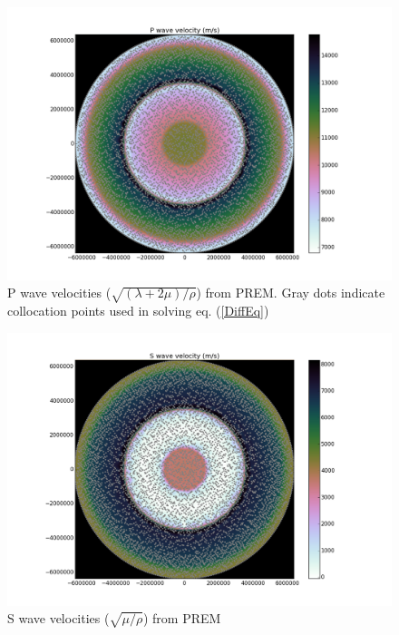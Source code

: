 \documentclass[12pt]{article}
\begin{document}
\begin{figure}[h!]
\includegraphics[scale=0.5]{figures/Pvel}
\centering
\caption{P wave velocities ($\sqrt{(\lambda + 2\mu)/\rho}$) from PREM.
  Gray dots indicate collocation points used in solving
  eq. (\ref{DiffEq})}

\end{figure}
\begin{figure}[h!]
\includegraphics[scale=0.5]{figures/Svel}
\centering
\caption{S wave velocities ($\sqrt{\mu/\rho}$) from PREM}

\end{figure}
\end{document}
